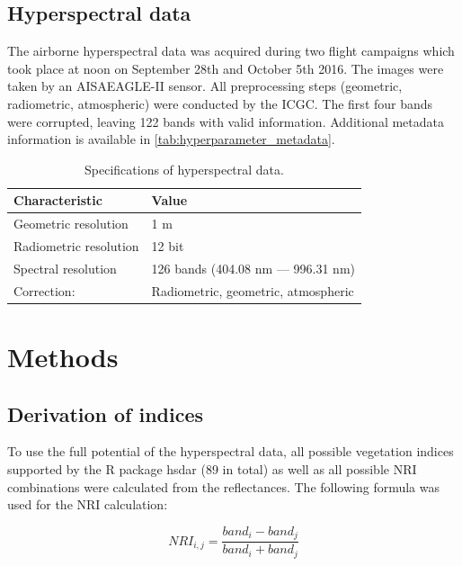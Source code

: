\documentclass[letterpaper, peerreview, draftcls]{IEEEtran}
\begin{document}
\subsection{Hyperspectral data}

The airborne hyperspectral data was acquired during two flight campaigns which took place at noon on September 28th and October 5th 2016.
The images were taken by an AISAEAGLE-II sensor.
All preprocessing steps (geometric, radiometric, atmospheric) were conducted by the \ac{ICGC}.
The first four bands were corrupted, leaving 122 bands with valid information.
Additional metadata information is available in \autoref{tab:hyperparameter_metadata}.


\begin{table}[t]
	\centering
	\caption[t]{Specifications of hyperspectral data.}
	\begingroup
	\begin{tabular}{ll}
		\\
		Characteristic         & Value                               \\
		\toprule
		Geometric resolution   & 1 m                                 \\
		Radiometric resolution & 12 bit                              \\
		Spectral resolution    & 126 bands (404.08 nm --- 996.31 nm) \\
		Correction:            & Radiometric, geometric, atmospheric
	\end{tabular}
	\endgroup\label{tab:hyperparameter_metadata}
\end{table}

\section{Methods}

\subsection{Derivation of indices}

To use the full potential of the hyperspectral data, all possible vegetation indices supported by the R package hsdar (89 in total) as well as all possible \ac{NRI} combinations were calculated from the reflectances.
The following formula was used for the NRI calculation:

\begin{equation}
	NRI_{i,j} = \frac{band_{i} - band_{j}}{band_{i} + band_{j}}
\end{equation}
\end{document}
